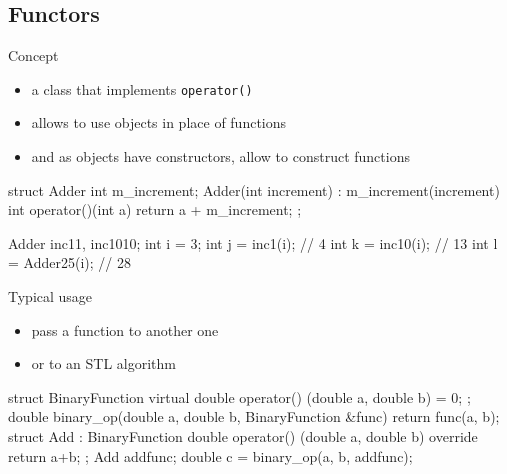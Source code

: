 \subsection[()]{Functors}

\begin{frame}[fragile]
  \begin{block}{Concept}
    \begin{itemize}
    \item a class that implements \texttt{operator()}
    \item allows to use objects in place of functions
    \item and as objects have constructors, allow to construct functions
    \end{itemize}
  \end{block}
  \begin{cppcode}
    struct Adder {
      int m_increment;
      Adder(int increment) : m_increment(increment) {}
      int operator()(int a) { return a + m_increment; }
    };

    Adder inc1{1}, inc10{10};
    int i = 3;
    int j = inc1(i);  // 4
    int k = inc10(i); // 13
    int l = Adder{25}(i); // 28
  \end{cppcode}
\end{frame}

\begin{frame}[fragile]
  \begin{block}{Typical usage}
    \begin{itemize}
    \item pass a function to another one
    \item or to an STL algorithm
    \end{itemize}
  \end{block}
  \begin{cppcode}
    struct BinaryFunction {
      virtual double operator() (double a, double b) = 0;
    };
    double binary_op(double a, double b, BinaryFunction &func) {
      return func(a, b);
    }
    struct Add : BinaryFunction {
      double operator() (double a, double b) override
      { return a+b; }
    };
    Add addfunc;
    double c = binary_op(a, b, addfunc);
  \end{cppcode}
\end{frame}
